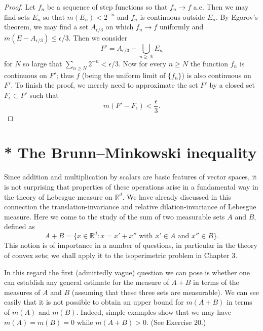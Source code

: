 \documentclass[11pt,openany]{book}
\begin{document}
\begin{proof}
Let $f_n$ be a sequence of step functions so that $f_n\to f$ a.e. Then we may find sets $E_n$ so that $m(E_n)<2^{-n}$ and $f_n$ is continuous outside $E_n$. By Egorov's theorem, we may find a set $A_{\epsilon/3}$ on which $f_n\to f$ uniformly and $m(E-A_{\epsilon/3})\le\epsilon/3$. Then we consider
\[
 F'=A_{\epsilon/3}-\bigcup_{n\ge N}E_n
\]
for $N$ so large that $\sum_{n\ge N}2^{-n}<\epsilon/3$. Now for every $n\ge N$ the function $f_n$ is continuous on $F'$; thus $f$ (being the uniform limit of $\{f_n\}$) is also continuous on $F'$. To finish the proof, we merely need to approximate the set $F'$ by a closed set $F_\epsilon\subset F'$ such that
\[
 m(F'-F_\epsilon)<\frac\epsilon3.
\]
\end{proof}

\section{* The Brunn--Minkowski inequality}

Since addition and multiplication by scalars are basic features of vector spaces, it is not surprising that properties of these operations arise in a fundamental way in the theory of Lebesgue measure on $\mathbb{R}^d$. We have already discussed in this connection the translation-invariance and relative dilation-invariance of Lebesgue measure. Here we come to the study of the sum of two measurable sets $A$ and $B$, defined as
\[
 A+B=\{x\in\mathbb{R}^d:x=x'+x''\text{ with }x'\in A\text{ and }x''\in B\}.
\]
This notion is of importance in a number of questions, in particular in the theory of convex sets; we shall apply it to the isoperimetric problem in Chapter 3.

In this regard the first (admittedly vague) question we can pose is whether one can establish any general estimate for the measure of $A+B$ in terms of the measures of $A$ and $B$ (assuming that these three sets are measurable). We can see easily that it is not possible to obtain an upper bound for $m(A+B)$ in terms of $m(A)$ and $m(B)$. Indeed, simple examples show that we may have $m(A)=m(B)=0$ while $m(A+B)>0$. (See Exercise 20.)
\end{document}
